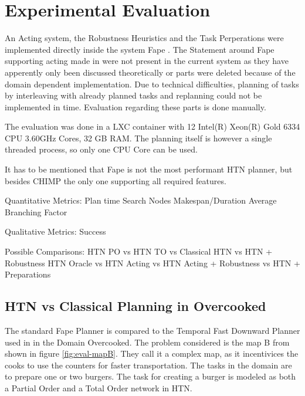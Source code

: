 \section{Experimental Evaluation}\label{sec:evaluation}

An Acting system, the Robustness Heuristics and the Task Perperations were implemented directly inside the system Fape \citep{bit-monnotFAPEConstraintbasedPlanner2020}.
The Statement around Fape supporting acting made in \cite{bit-monnotTemporalHierarchicalModels2017} were not present in the current system as they have apperently only been discussed theoretically or parts were deleted because of the domain dependent implementation.
Due to technical difficulties, planning of tasks by interleaving with already planned tasks and replanning could not be implemented in time.
Evaluation regarding these parts is done manually.

The evaluation was done in a LXC container with 12 Intel(R) Xeon(R) Gold 6334 CPU 3.60GHz Cores, 32 GB RAM.
The planning itself is however a single threaded process, so only one CPU Core can be used.

It has to be mentioned that Fape is not the most performant HTN planner, but besides CHIMP the only one supporting all required features.

Quantitative Metrics:
Plan time
Search Nodes
Makespan/Duration
Average Branching Factor

Qualitative Metrics:
Success

Possible Comparisons:
HTN PO vs HTN TO vs Classical \citep{yuxinliuPlanningOvercookedGame2020}
HTN vs HTN + Robustness
HTN Oracle vs HTN Acting vs HTN Acting + Robustness vs HTN + Preparations


\subsection{HTN vs Classical Planning in Overcooked}


The standard Fape Planner is compared to the Temporal Fast Downward Planner used in \cite{yuxinliuPlanningOvercookedGame2020} in the Domain Overcooked.
The problem considered is the map B from \cite{yuxinliuPlanningOvercookedGame2020} shown in figure \ref{fig:eval-mapB}.
They call it a complex map, as it incentivices the cooks to use the counters for faster transportation.
The tasks in the domain are to prepare one or two burgers.
The task for creating a burger is modeled as both a Partial Order and a Total Order network in HTN.